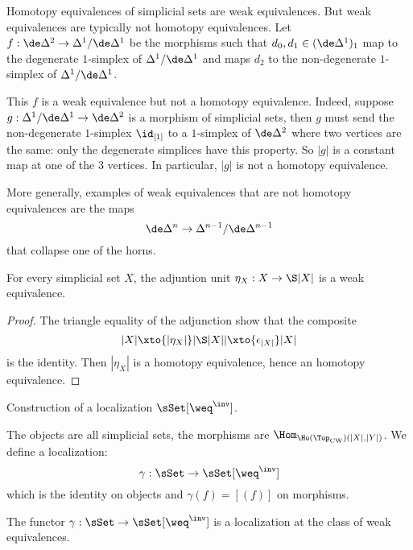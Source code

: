 \begin{examples}
Homotopy equivalences of simplicial sets are weak equivalences. But weak equivalences are typically not homotopy equivalences.
Let $f:\de\Delta^2\to\Delta^1/\de\Delta^1$
be the morphisms such that $d_0,d_1\in(\de\Delta^1)_1$ map to the degenerate $1$-simplex of $\Delta^1/\de\Delta^1$ and maps $d_2$ to the non-degenerate $1$-simplex of $\Delta^1/\de\Delta^1$.\alvaropls

This $f$ is a weak equivalence but not a homotopy equivalence. Indeed, suppose $g:\Delta^1/\de\Delta^1\to\de\Delta^2$ is a morphism of simplicial sets, then $g$ must send the non-degenerate $1$-simplex $\id_{[1]}$ to a $1$-simplex of $\de\Delta^2$ where two vertices are the same: only the degenerate simplices have this property. So $|g|$ is a constant map at one of the $3$ vertices. In particular, $|g|$ is not a homotopy equivalence.

More generally, examples of weak equivalences that are not homotopy equivalences are the maps
\[\de\Delta^n\to\Delta^{n-1}/\de\Delta^{n-1}\]
that collapse one of the horns.
\end{examples}

\begin{proposition}
For every simplicial set $X$, the adjuntion unit $\eta_X:X\to\S|X|$ is a weak equivalence.
\end{proposition}

\begin{proof}
The triangle equality of the adjunction show that the composite
\[|X|\xto{|\eta_X|}|\S|X||\xto{\epsilon_{|X|}}|X|\]
is the identity. Then $|\eta_X|$ is a homotopy equivalence, hence an homotopy equivalence.
\end{proof}

Construction of a localization $\sSet[\weq^\inv]$.

The objects are all simplicial sets, the morphisms are $\Hom_{\Ho(\Top_\text{CW})(|X|,|Y|)}$. We define a localization:
\[\gamma:\sSet\to\sSet[\weq^\inv]\]
which is the identity on objects and $\gamma(f)=[(f)]$ on morphisms.

\begin{theorem}
The functor $\gamma:\sSet\to\sSet[\weq^\inv]$ is a localization at the class of weak equivalences.
\end{theorem}

